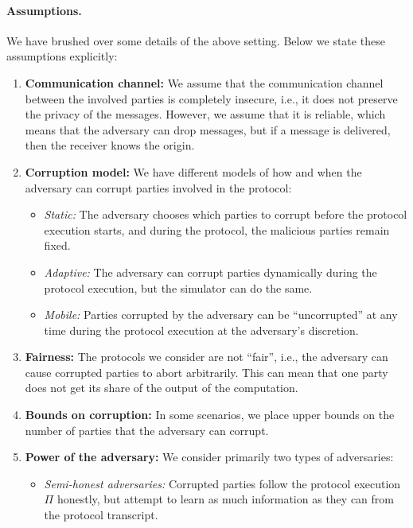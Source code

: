 \paragraph{Assumptions.} We have brushed over some details of the above setting.
Below we state these assumptions explicitly:
\begin{enumerate}
  \item \textbf{Communication channel:} We assume that the communication channel
    between the involved parties is completely insecure, i.e., it does not preserve
    the privacy of the messages. However, we assume that it is reliable, which means
    that the adversary can drop messages, but if a message is delivered, then
    the receiver knows the origin.

  \item \textbf{Corruption model:} We have different models of how and when the
    adversary can corrupt parties involved in the protocol:
    \begin{itemize}
      \item
        \emph{Static:} The adversary chooses which parties to corrupt before the
        protocol execution starts, and during the protocol, the malicious parties
        remain fixed.
      \item
        \emph{Adaptive:} The adversary can corrupt parties dynamically during
        the protocol execution, but the simulator can do the same.
      \item
        \emph{Mobile:} Parties corrupted by the adversary can be ``uncorrupted''
        at any time during the protocol execution at the adversary's discretion.
    \end{itemize}

  \item \textbf{Fairness:} The protocols we consider are not ``fair'', i.e.,
    the adversary can cause corrupted parties to abort arbitrarily. This can
    mean that one party does not get its share of the output of the computation.

  \item \textbf{Bounds on corruption:} In some scenarios, we place upper bounds
    on the number of parties that the adversary can corrupt.

  \item \textbf{Power of the adversary:} We consider primarily two types of
    adversaries:
    \begin{itemize}
      \item \emph{Semi-honest adversaries:} Corrupted parties follow the protocol
        execution $\Pi$ honestly, but attempt to learn as much information as they
        can from the protocol transcript.


\end{itemize}
\end{enumerate}
